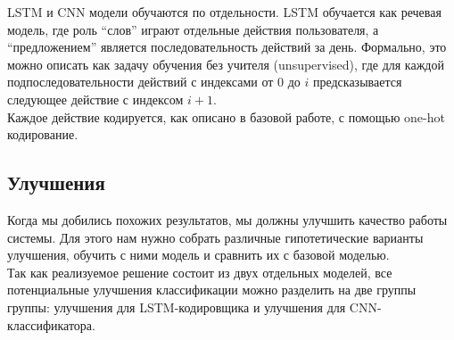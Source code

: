 LSTM и CNN модели обучаются по отдельности. LSTM обучается как речевая модель, где роль ``слов'' играют отдельные действия пользователя, а ``предложением'' является последовательность действий за день. Формально, это можно описать как задачу обучения без учителя (unsupervised), где для каждой подпоследовательности действий с индексами от $0$ до $i$ предсказывается следующее действие с индексом $i+1$.\\
Каждое действие кодируется, как описано в базовой работе, с помощью one-hot кодирование.\\

\subsection{Улучшения}

Когда мы добились похожих результатов, мы должны улучшить качество работы системы. Для этого нам нужно собрать различные гипотетические варианты улучшения, обучить с ними модель и сравнить их с базовой моделью.\\
Так как реализуемое решение состоит из двух отдельных моделей, все потенциальные улучшения классификации можно разделить на две группы группы: улучшения для LSTM-кодировщика и улучшения для CNN-классификатора.
